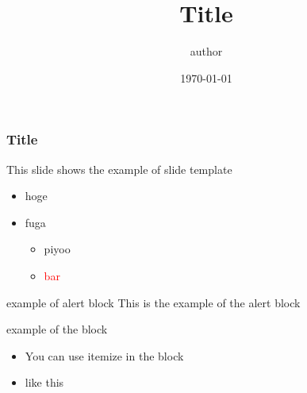 \documentclass[11pt, dvipdfm]{beamer}
\title[title]{Title}
\author[author]{author}
\institute[institute]{institute}
\date[\today]{\today}
\newlength{\wideitemsep}
\let\olditem\item
\renewcommand{\item}{\setlength{\itemsep}{\wideitemsep}\olditem}
\begin{document}
\begin{frame}[plain]
  \titlepage
\end{frame}
\begin{frame}
\frametitle{Title}
This slide shows the example of slide template

\begin{itemize}
    \item hoge
    \item fuga
    \begin{itemize}
        \item piyoo
        \item \textcolor{red}{bar}
    \end{itemize}
\end{itemize}

\begin{alertblock}{example of alert block}
This is the example of the alert block
\end{alertblock}

\begin{block}{example of the block}
\begin{itemize}
    \item You can use itemize in the block
    \item like this
\end{itemize}
\end{block}

\end{frame}
%
\end{document}
